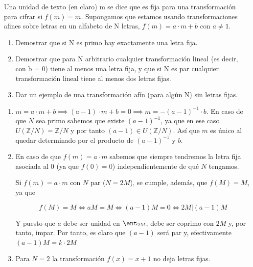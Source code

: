 \begin{problem}[9]
	Una unidad de texto (en claro) m se dice que es fija para una transformación para cifrar si $f(m) = m$. Supongamos que estamos usando transformaciones afines sobre letras en un alfabeto de N letras, $f(m) = a · m + b$ con $a ≠ 1$.

	\begin{enumerate}
		\item Demostrar que si N es primo hay exactamente una letra fija.
		\item Demostrar que para N arbitrario cualquier transformación lineal (es decir, con b = 0) tiene al menos una letra fija, y que si N es par cualquier transformación lineal tiene al menos dos letras fijas.
		\item Dar un ejemplo de una transformación afín (para algún N) sin letras fijas.
	\end{enumerate}

	\solution
	\begin{enumerate}
		\item $m = a · m + b  \implies (a-1)·m + b = 0 \implies m = -(a-1)^{-1} · b$. En caso de que $N$ sea primo sabemos que existe $(a-1)^{-1}$, ya que en ese caso $U(ℤ/N)=ℤ/N$ y por tanto $(a-1) ∈ U(ℤ/N)$. Así que $m$ es único al quedar determinado por el producto de $(a-1)^{-1}$ y $b$.

		\item En caso de que $f(m) = a·m$ sabemos que siempre tendremos la letra fija asociada al 0 (ya que $f(0)=0$) independientemente de qué $N$ tengamos.

		Si $f(m) = a·m$ con $N$ par ($N=2M$), se cumple, además, que $f(M)=M$, ya que

		\[f(M)=M \iff aM = M \iff (a-1)M = 0 \iff 2M | (a-1)M \]

		Y puesto que $a$ debe ser unidad en $\ent_{2M}$, debe ser coprimo con $2M$ y, por tanto, impar. Por tanto, es claro que $(a-1)$ será par y, efectivamente $(a-1)M = k \cdot 2M$

		\item Para $N=2$ la transformación $f(x) = x + 1$ no deja letras fijas.
	\end{enumerate}
\end{problem}

